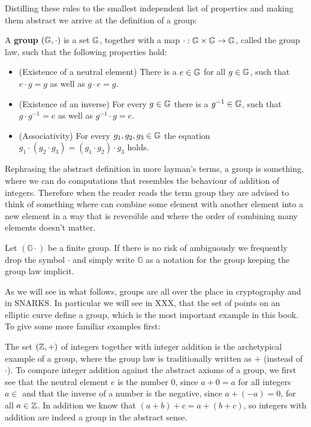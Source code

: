 Distilling these rules to the smallest independent list of properties and making them abstract we arrive at the definition of a group:

A \textbf{group} $(\mathbb{G},\cdot) $ is a set $ \mathbb{G}$, together with a map $ \cdot: \mathbb{G} \times \mathbb{G} \to \mathbb{G} $, called the group law, such that the following properties hold:
\begin{itemize}
\item (Existence of a neutral element) There is a $e\in\mathbb{G}$ for all $g\in\mathbb{G}$, such that $e\cdot g=g$ as well as $g\cdot e = g$.
\item (Existence of an inverse) For every $g\in\mathbb{G}$ there is a $g^{-1}\in\mathbb{G}$, such that $g\cdot g^{-1}=e$ as well as $g^{-1}\cdot g = e$.
\item (Associativity) For every $g_1,g_2,g_3\in\mathbb{G}$ the equation
$g_1\cdot(g_2\cdot g_3) = (g_1\cdot g_2)\cdot g_3$ holds.
\end{itemize}
Rephrasing the abstract definition in more layman's terms, a group is something, where we can do computations that resembles the behaviour of addition of integers. Therefore when the reader reads the term group they are advised to think of something where can combine some element with another element into a new element in a way that is reversible and where the order of combining many elements doesn't matter.
\begin{notation}
Let $(\mathbb{G}\cdot)$ be a finite group. If there is no risk of ambiguously we frequently drop the symbol $\cdot$ and simply write $\mathbb{G}$ as a notation for the group keeping the group law implicit.
\end{notation}
As we will see in what follows, groups are all over the place in cryptography and in SNARKS. In particular we will see in XXX, that the set of points on an elliptic curve define a group, which is the most important example in this book. To give some more familiar examples first:
\begin{example}
The set $(\mathbb{Z},+)$ of integers together with integer addition is the archetypical example of a group, where the group law is traditionally written as $+$ (instead of $\cdot$). To compare integer addition against the abstract axioms of a group, we first see that the neutral element $e$ is the number $0$, since $a+0=a$ for all integers $a\in $ and that the inverse of a number is the negative, since $a+(-a)=0$, for all $a\in\mathbb{Z}$. In addition we know that $(a+b)+c=a+(b+c)$, so integers with addition are indeed a group in the abstract sense.
\end{example}
